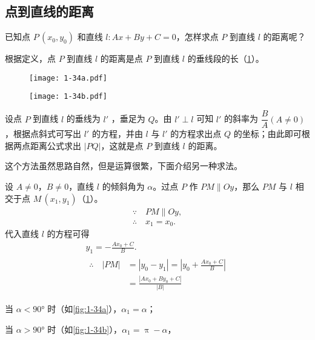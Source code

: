 \subsection{点到直线的距离}
已知点 $P\,(x_0,y_0)$ 和直线 $l:Ax+By+C=0$，怎样求点 $P$ 到直线 $l$ 的距离呢？

根据定义，点 $P$ 到直线 $l$ 的距离是点 $P$ 到直线 $l$ 的垂线段的长（\cref{fig:1-34}）。
\begin{figure}
  \begin{minipage}[b]{0.48\linewidth}\centering
  \texttt{[image: 1-34a.pdf]}
  \subcaption{}\label{fig:1-34a}
  \end{minipage}
  \begin{minipage}[b]{0.48\linewidth}\centering
  \texttt{[image: 1-34b.pdf]}
  \subcaption{}\label{fig:1-34b}
  \end{minipage}
  \caption{}\label{fig:1-34}
\end{figure}

设点 $P$ 到直线 $l$ 的垂线为 $l'$ ，垂足为 $Q$。由 $l'\perp l$ 可知 $l'$ 的斜率为 $\dfrac{B}{A}(A \neq 0)$，根据点斜式可写出 $l'$ 的方程，并由 $l$ 与 $l'$ 的方程求出点 $Q$ 的坐标；由此即可根据两点距离公式求出 $|PQ|$，这就是点 $P$ 到直线 $l$ 的距离。

这个方法虽然思路自然，但是运算很繁，下面介绍另一种求法。

设 $A\neq 0$，$B\neq 0$，直线 $l$ 的倾斜角为 $\alpha$。过点 $P$ 作 $PM\parallel Oy$，那么 $PM$ 与 $l$ 相交于点 $M\,(x_1,y_1)$（\cref{fig:1-34}）。
\begin{gather*}
\because \quad PM\parallel Oy,\\
\therefore \quad x_1=x_0.
\end{gather*}
代入直线 $l$ 的方程可得
\begin{gather*}
  y_1=-\frac{Ax_0+C}{B}.\\
  \begin{split}
  \therefore\quad |PM| & =|y_0-y_1|=\left|y_0+\frac{Ax_0+C}{B}\right|\\
                  & = \frac{|Ax_0+By_0+C|}{|B|}
  \end{split}
\end{gather*}

当 $\alpha<\ang{90}$ 时（如\cref{fig:1-34a}），$\alpha_1=\alpha$；

当 $\alpha>\ang{90}$ 时（如\cref{fig:1-34b}），$\alpha_1= \uppi-\alpha$，

